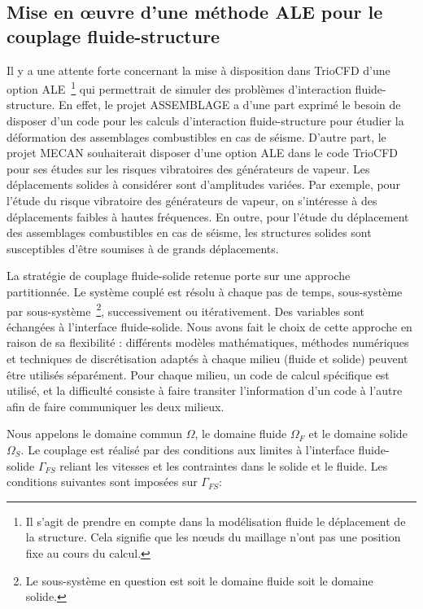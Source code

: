 \subsection{Mise en {\oe}uvre d'une m\'ethode ALE pour le couplage fluide-structure}
\label{section-ALE}


Il y a une attente forte concernant la mise \`a disposition dans TrioCFD d'une option ALE~\footnote{Il s'agit de prendre en compte dans la mod\'elisation fluide le d\'eplacement de la structure. Cela signifie que les n{\oe}uds du maillage n'ont pas une position fixe au cours du calcul.}  qui permettrait de simuler des probl\`emes d'interaction fluide-structure.  En effet, le projet ASSEMBLAGE a d'une part exprim\'e le besoin de disposer d'un code pour les calculs d'interaction fluide-structure pour \'etudier la d\'eformation des assemblages combustibles en cas de s\'eisme. D'autre part, le projet MECAN souhaiterait disposer d'une option ALE dans le code TrioCFD pour ses \'etudes sur les risques vibratoires des g\'en\'erateurs de vapeur. Les d\'eplacements solides \`a consid\'erer sont d'amplitudes vari\'ees. Par exemple, pour l'\'etude du risque vibratoire des g\'en\'erateurs de vapeur, on s'int\'eresse \`a des  d\'eplacements faibles \`a hautes fr\'equences. En outre, pour l'\'etude du d\'eplacement des assemblages combustibles en cas de s\'eisme, les structures solides sont susceptibles d'\^etre soumises \`a de grands d\'eplacements.



La strat\'egie de couplage fluide-solide retenue porte sur une approche partitionn\'ee. Le syst\`eme coupl\'e est r\'esolu \`a chaque pas de temps, sous-syst\`eme par sous-syst\`eme~\footnote{Le sous-syst\`eme en question est soit le domaine fluide soit le domaine solide.}, successivement ou it\'erativement. Des variables sont \'echang\'ees \`a l'interface fluide-solide. 
Nous avons fait le choix de cette approche en raison de sa flexibilit\'e : diff\'erents mod\`eles math\'ematiques, m\'ethodes num\'eriques et techniques
de discr\'etisation adapt\'es \`a chaque milieu (fluide et solide) peuvent \^etre utilis\'es s\'epar\'ement. 
Pour chaque milieu, un code de calcul sp\'ecifique est
utilis\'e, et la difficult\'e consiste \`a faire transiter l'information d'un code \`a l'autre afin de faire communiquer les deux milieux. 


Nous appelons le domaine commun $\Omega$, le domaine fluide $\Omega_F $ et le domaine solide $\Omega_S$.
Le couplage est r\'ealis\'e par des conditions aux limites \`a l'interface fluide-solide $\Gamma_{FS}$ reliant les vitesses et les contraintes dans le solide et le fluide. Les conditions suivantes sont impos\'ees sur $\Gamma_{FS}$:

